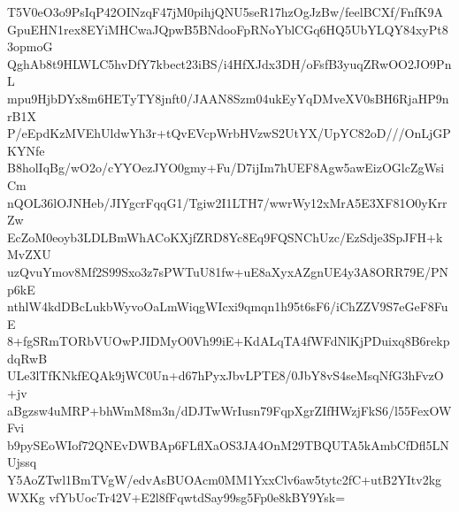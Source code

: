 T5V0eO3o9PsIqP42OINzqF47jM0pihjQNU5seR17hzOgJzBw/feelBCXf/FnfK9A
GpuEHN1rex8EYiMHCwaJQpwB5BNdooFpRNoYblCGq6HQ5UbYLQY84xyPt83opmoG
QghAb8t9HLWLC5hvDfY7kbect23iBS/i4HfXJdx3DH/oFsfB3yuqZRwOO2JO9PnL
mpu9HjbDYx8m6HETyTY8jnft0/JAAN8Szm04ukEyYqDMveXV0sBH6RjaHP9nrB1X
P/eEpdKzMVEhUldwYh3r+tQvEVcpWrbHVzwS2UtYX/UpYC82oD///OnLjGPKYNfe
B8holIqBg/wO2o/cYYOezJYO0gmy+Fu/D7ijIm7hUEF8Agw5awEizOGlcZgWsiCm
nQOL36lOJNHeb/JIYgcrFqqG1/Tgiw2I1LTH7/wwrWy12xMrA5E3XF81O0yKrrZw
EcZoM0eoyb3LDLBmWhACoKXjfZRD8Yc8Eq9FQSNChUzc/EzSdje3SpJFH+kMvZXU
uzQvuYmov8Mf2S99Sxo3z7sPWTuU81fw+uE8aXyxAZgnUE4y3A8ORR79E/PNp6kE
nthlW4kdDBcLukbWyvoOaLmWiqgWIcxi9qmqn1h95t6sF6/iChZZV9S7eGeF8FuE
8+fgSRmTORbVUOwPJIDMyO0Vh99iE+KdALqTA4fWFdNlKjPDuixq8B6rekpdqRwB
ULe3lTfKNkfEQAk9jWC0Un+d67hPyxJbvLPTE8/0JbY8vS4seMsqNfG3hFvzO+jv
aBgzsw4uMRP+bhWmM8m3n/dDJTwWrIusn79FqpXgrZIfHWzjFkS6/l55FexOWFvi
b9pySEoWIof72QNEvDWBAp6FLflXaOS3JA4OnM29TBQUTA5kAmbCfDfl5LNUjssq
Y5AoZTwl1BmTVgW/edvAsBUOAcm0MM1YxxClv6aw5tytc2fC+utB2YItv2kgWXKg
vfYbUocTr42V+E2l8fFqwtdSay99sg5Fp0e8kBY9Ysk=
